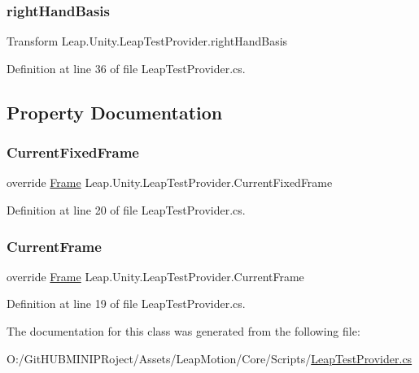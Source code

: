 \subsubsection{\texorpdfstring{rightHandBasis}{rightHandBasis}}
{\footnotesize\ttfamily Transform Leap.\+Unity.\+Leap\+Test\+Provider.\+right\+Hand\+Basis}



Definition at line 36 of file Leap\+Test\+Provider.\+cs.



\subsection{Property Documentation}
\mbox{\label{class_leap_1_1_unity_1_1_leap_test_provider_a207745bc4f21181bbb6a6d6c10fdfeb0}} 
\subsubsection{\texorpdfstring{CurrentFixedFrame}{CurrentFixedFrame}}
{\footnotesize\ttfamily override \mbox{\hyperlink{class_leap_1_1_frame}{Frame}} Leap.\+Unity.\+Leap\+Test\+Provider.\+Current\+Fixed\+Frame\hspace{0.3cm}{\ttfamily [get]}}



Definition at line 20 of file Leap\+Test\+Provider.\+cs.

\mbox{\label{class_leap_1_1_unity_1_1_leap_test_provider_a164a6a68635fa3665c4c9c75156d3374}} 
\subsubsection{\texorpdfstring{CurrentFrame}{CurrentFrame}}
{\footnotesize\ttfamily override \mbox{\hyperlink{class_leap_1_1_frame}{Frame}} Leap.\+Unity.\+Leap\+Test\+Provider.\+Current\+Frame\hspace{0.3cm}{\ttfamily [get]}}



Definition at line 19 of file Leap\+Test\+Provider.\+cs.



The documentation for this class was generated from the following file\+:\begin{DoxyCompactItemize}
\item 
O\+:/\+Git\+H\+U\+B\+M\+I\+N\+I\+P\+Roject/\+Assets/\+Leap\+Motion/\+Core/\+Scripts/\mbox{\hyperlink{_leap_test_provider_8cs}{Leap\+Test\+Provider.\+cs}}\end{DoxyCompactItemize}
